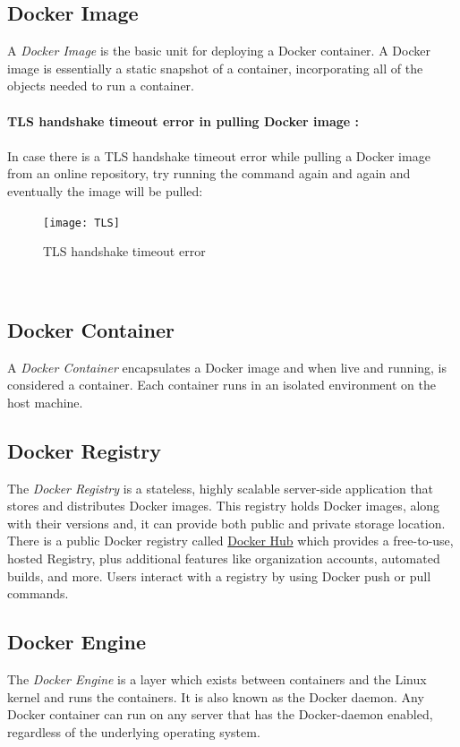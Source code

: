 \documentclass[12pt]{report}
\begin{document}
\subsection{Docker Image}
A \textit{Docker Image} is the basic unit for deploying a Docker container. A Docker image is essentially a static snapshot of a container, incorporating all of the objects needed to run a container.\\\\
\textbf{TLS handshake timeout error in pulling Docker image :}\\\\
In case there is a TLS handshake timeout error while pulling a Docker image from an online repository, try running the command again and again and eventually the image will be pulled:
\begin{figure}[h!]
	\begin{center}
		\texttt{[image: TLS]}
		\caption{TLS handshake timeout error}
	\end{center}
\end{figure} 
\\
\subsection{Docker Container}
A \textit{Docker Container} encapsulates a Docker image and when live and running, is considered a container. Each container runs in an isolated environment on the host machine.
\subsection{Docker Registry}
The \textit{Docker Registry} is a stateless, highly scalable server-side application that stores and distributes Docker images. This registry holds Docker images, along with their versions and, it can provide both public and private storage location. There is a public Docker registry called \href{https://hub.docker.com/}{Docker Hub}\cite{Dockerhub} which provides a free-to-use, hosted Registry, plus additional features like organization accounts, automated builds, and more. Users interact with a registry by using Docker push or pull commands.
\subsection{Docker Engine}
The \textit{Docker Engine} is a layer which exists between containers and the Linux kernel and runs the containers. It is also known as the Docker daemon. Any Docker container can run on any server that has the Docker-daemon enabled, regardless of the underlying operating system.
\end{document}
